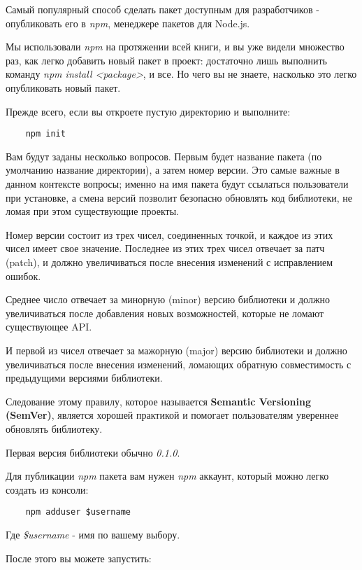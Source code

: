 Самый популярный способ сделать пакет доступным для разработчиков - опубликовать его в \textit{npm}, менеджере пакетов для Node.js.

Мы использовали \textit{npm} на протяжении всей книги, и вы уже видели множество раз, как легко добавить новый пакет в проект: достаточно лишь выполнить команду \textit{npm install <package>}, и все. Но чего вы не знаете, насколько это легко опубликовать новый пакет.

Прежде всего, если вы откроете пустую директорию и выполните:

\begin{lstlisting}
	npm init
\end{lstlisting}

Вам будут заданы несколько вопросов. Первым будет название пакета (по умолчанию название директории), а затем номер версии. Это самые важные в данном контексте вопросы; именно на имя пакета будут ссылаться пользователи при установке, а смена версий позволит безопасно обновлять код библиотеки, не ломая при этом существующие проекты.

Номер версии состоит из трех чисел, соединенных точкой, и каждое из этих чисел имеет свое значение. Последнее из этих трех чисел отвечает за патч (patch), и должно увеличиваться после внесения изменений с исправлением ошибок.

Среднее число отвечает за минорную (minor) версию библиотеки и должно увеличиваться после добавления новых возможностей, которые не ломают существующее API.

И первой из чисел отвечает за мажорную (major) версию библиотеки и должно увеличиваться после внесения изменений, ломающих обратную совместимость с предыдущими версиями библиотеки.

Следование этому правилу, которое называется \textbf{Semantic Versioning (SemVer)}, является хорошей практикой и помогает пользователям увереннее обновлять библиотеку.

Первая версия библиотеки обычно \textit{0.1.0}. 

Для публикации \textit{npm} пакета вам нужен \textit{npm} аккаунт, который можно легко создать из консоли:

\begin{lstlisting}
	npm adduser $username
\end{lstlisting}

Где \textit{\$username} - имя по вашему выбору.

После этого вы можете запустить:

